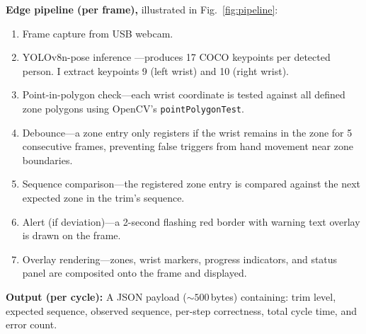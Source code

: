 \documentclass[conference]{IEEEtran}
\begin{document}
\textbf{Edge pipeline (per frame),} illustrated in Fig.~\ref{fig:pipeline}:
\begin{enumerate}
    \item Frame capture from USB webcam.
    \item YOLOv8n-pose inference \cite{b1}---produces 17 COCO keypoints \cite{b6} per detected person. I extract keypoints 9 (left wrist) and 10 (right wrist).
    \item Point-in-polygon check---each wrist coordinate is tested against all defined zone polygons using OpenCV's \cite{b4} \texttt{pointPolygonTest}.
    \item Debounce---a zone entry only registers if the wrist remains in the zone for 5 consecutive frames, preventing false triggers from hand movement near zone boundaries.
    \item Sequence comparison---the registered zone entry is compared against the next expected zone in the trim's sequence.
    \item Alert (if deviation)---a 2-second flashing red border with warning text overlay is drawn on the frame.
    \item Overlay rendering---zones, wrist markers, progress indicators, and status panel are composited onto the frame and displayed.
\end{enumerate}

\textbf{Output (per cycle):} A JSON payload (${\sim}500$\,bytes) containing: trim level, expected sequence, observed sequence, per-step correctness, total cycle time, and error count.
\end{document}
